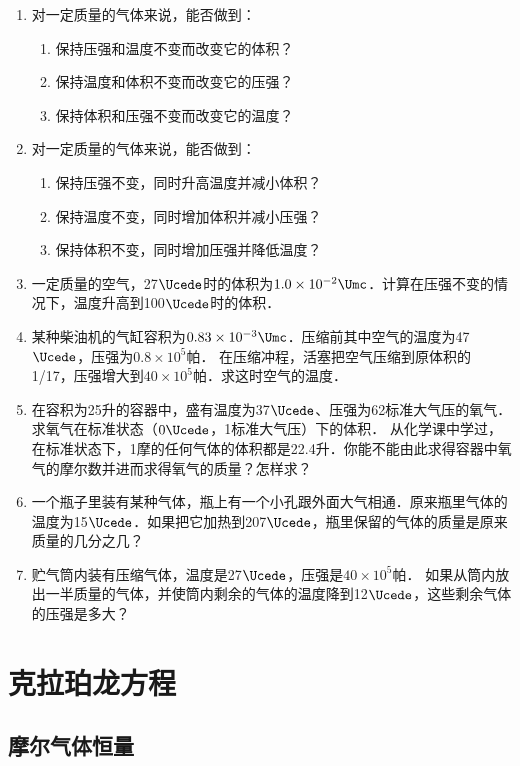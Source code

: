 \begin{enumerate}
    \item 对一定质量的气体来说，能否做到：
    \begin{enumerate}
    \item    保持压强和温度不变而改变它的体积？
    \item    保持温度和体积不变而改变它的压强？
    \item    保持体积和压强不变而改变它的温度？     
    \end{enumerate}
\item  对一定质量的气体来说，能否做到：
\begin{enumerate}
\item 保持压强不变，同时升高温度并减小体积？
\item 保持温度不变，同时增加体积并减小压强？
\item 保持体积不变，同时增加压强并降低温度？
\end{enumerate}

\item  一定质量的空气，27$\Ucede$时的体积为$1.0\times 10^{-2} \Umc$．计算在压强不变的情况下，温度升高到100$\Ucede$时的体积．
\item  某种柴油机的气缸容积为$0.83\times 10^{-3} \Umc$．压缩前其中空气的温度为47$\Ucede$，压强为$0.8\times 10^5$帕．
在压缩冲程，活塞把空气压缩到原体积的1/17，压强增大到$40\times 10^5$帕．求这时空气的温度．
\item  在容积为25升的容器中，盛有温度为37$\Ucede$、压强为62标准大气压的氧气．求氧气在标准状态（$0 \Ucede$，1标准大气压）下的体积．
从化学课中学过，在标准状态下，1摩的任何气体的体积都是22.4升．你能不能由此求得容器中氧气的摩尔数并进而求得氧气的质量？怎样求？
\item  一个瓶子里装有某种气体，瓶上有一个小孔跟外面大气相通．原来瓶里气体的温度为15$\Ucede$．如果把它加热到207$\Ucede$，瓶里保留的气体的质量是原来质量的几分之几？
\item  贮气筒内装有压缩气体，温度是27$\Ucede$，压强是$40\times 10^5$帕．
如果从筒内放出一半质量的气体，并使筒内剩余的气体的温度降到12$\Ucede$，这些剩余气体的压强是多大？

\end{enumerate}


\section{克拉珀龙方程}
\subsection{摩尔气体恒量} 

